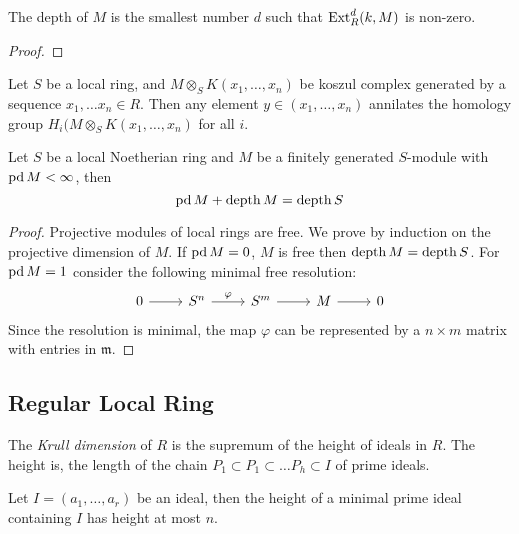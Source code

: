 \begin{theorem}
	The depth of $M$ is the smallest number $d$ such that $\operatorname{Ext}_R^d(k,M)$ is non-zero.
\end{theorem}
\begin{proof}

\end{proof}

\begin{lemma}
	\label{IdealAnnilKoszulHomology}
	Let $S$ be a local ring, and $M \otimes_S K(x_1, \dots, x_n)$ be koszul complex generated by a sequence $x_1, \dots x_n \in R$.
	Then any element $y \in (x_1, \dots, x_n)$ annilates the homology group $H_i(M \otimes_S K(x_1, \dots, x_n)$ for all $i$.
\end{lemma}

\begin{theorem}%
	\label{Auslander-Buchsbaum formula}
	Let $S$ be a local Noetherian ring and $M$ be a finitely generated $S$-module with $\operatorname{pd} M < \infty$, then
	$$\operatorname{pd} M + \operatorname{depth} M = \operatorname{depth} S$$
\end{theorem}
\begin{proof}
	Projective modules of local rings are free.
	We prove by induction on the projective dimension of $M$.
	If $\operatorname{pd} M = 0$, $M$ is free then $\operatorname{depth} M = \operatorname{depth} S$.
	For $\operatorname{pd} M = 1$ consider the following minimal free resolution:
	$$\begin{tikzcd}
		0 \arrow[r] & S^n \arrow[r, "\varphi"] & S^m \arrow[r] & M \arrow[r] & 0
	\end{tikzcd}$$
	Since the resolution is minimal, the map $\varphi$ can be represented by a $n \times m$ matrix with entries in $\mathfrak{m}$.
\end{proof}
\subsection{Regular Local Ring}

\begin{definition}
	The \textit{Krull dimension} of $R$ is the supremum of the height of ideals in $R$.
	The height is, the length of the chain $P_1 \subset P_1 \subset \dots P_h \subset I$ of prime ideals.
\end{definition}

\begin{theorem}
	Let $I = (a_1, \dots, a_r)$ be an ideal, then the height of a minimal prime ideal containing $I$ has height at most $n$.
\end{theorem}

